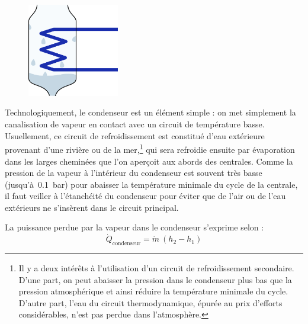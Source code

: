 		\begin{figure}
			\begin{center}
				\includegraphics[width=4cm]{images/symbole_condenseur.png}
			\end{center}
			\label{fig_centrale_condenseur2}
		\end{figure}

		Technologiquement, le condenseur est un élément simple : on met simplement la canalisation de vapeur en contact avec un circuit de température basse. Usuellement, ce circuit de refroidissement est constitué d’eau extérieure provenant d’une rivière ou de la mer,\footnote{Il y a deux intérêts à l’utilisation d’un circuit de refroidissement secondaire. D’une part, on peut abaisser la pression dans le condenseur plus bas que la pression atmosphérique et ainsi réduire la température minimale du cycle. D’autre part, l’eau du circuit thermodynamique, épurée au prix d’efforts considérables, n’est pas perdue dans l’atmosphère.}
		qui sera refroidie ensuite par évaporation dans les larges cheminées que l’on aperçoit aux abords des centrales. Comme la pression de la vapeur à l’intérieur du condenseur est souvent très basse (jusqu’à~\SI{0,1}{\bar}) pour abaisser la température minimale du cycle de la centrale, il faut veiller à l’étanchéité du condenseur pour éviter que de l’air ou de l’eau extérieurs ne s’insèrent dans le circuit principal.

		La puissance perdue par la vapeur dans le condenseur s’exprime selon :
		\begin{equation}
			\dot{Q}_\text{condenseur} = \dot{m} \ (h_2 - h_1)
		\end{equation}



